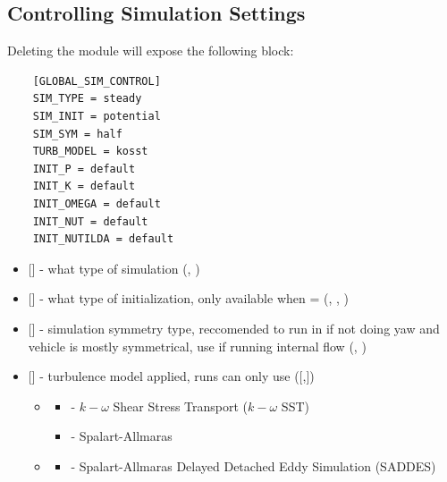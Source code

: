 \subsection{Controlling Simulation Settings}
Deleting the module  will expose the following block:
\begin{lstlisting}
    [GLOBAL_SIM_CONTROL]
    SIM_TYPE = steady
    SIM_INIT = potential
    SIM_SYM = half
    TURB_MODEL = kosst
    INIT_P = default
    INIT_K = default
    INIT_OMEGA = default
    INIT_NUT = default
    INIT_NUTILDA = default
\end{lstlisting}
\begin{itemize}
    \item {} [] - what type of simulation (, )
    
    \item {} [] - what type of initialization,  only available when  =  (, , )
    
    \item {} [] - simulation symmetry type, reccomended to run in  if not doing yaw and vehicle is mostly symmetrical, use  if running internal flow (, )
    
    \item {} [] - turbulence model applied,  runs can only use  ([,])
    \begin{itemize}
        \item {}
        \begin{itemize}
            \item {} - \(k-\omega\) Shear Stress Transport (\(k-\omega\) SST)
            \item {} - Spalart-Allmaras
        \end{itemize}
        \item {}
        \begin{itemize}
            \item {} - Spalart-Allmaras Delayed Detached Eddy Simulation (SADDES)
        \end{itemize}
    \end{itemize}


\end{itemize}

